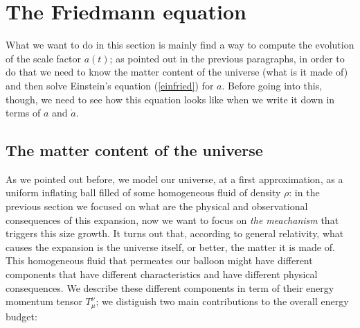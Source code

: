 \documentclass[11pt, a4paper,oneside,openright]{book}
\numberwithin{equation}{section}
\begin{document}
\section{The Friedmann equation}
What we want to do in this section is mainly find a way to compute the evolution of the scale factor $a(t)$; as pointed out in the previous paragraphs, in order to do that we need to know the matter content of the universe (what is it made of) and then solve Einstein's equation (\ref{einfried}) for $a$. Before going into this, though, we need to see how this equation looks like when we write it down in terms of $a$ and $\dot{a}$.
\subsection{The matter content of the universe}
As we pointed out before, we model our universe, at a first approximation, as a uniform inflating ball filled of some homogeneous fluid of density $\rho$: in the previous section we focused on what are the physical and observational consequences of this expansion, now we want to focus on \textit{the meachanism} that triggers this size growth. It turns out that, according to general relativity, what causes the expansion is the universe itself, or better, the matter it is made of. This homogeneous fluid that permeates our balloon might have different components that have different characteristics and have different physical consequences. We describe these different components in term of their energy momentum tensor $T_{\mu}^{\nu}$; we distiguish two main contributions to the overall energy budget:
\end{document}

